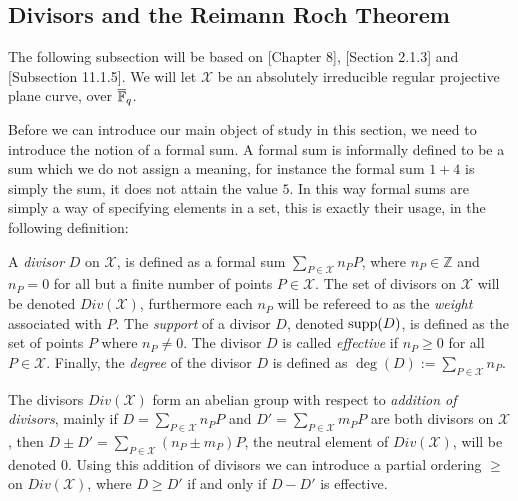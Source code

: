 \subsection{Divisors and the Reimann Roch Theorem}%
\label{subsec:divisors_and_the_reiman_roch_theorem}
The following subsection will be based on \cite{Fulton}[Chapter 8], \cite{alg_geom_codes}[Section 2.1.3] and \cite{CCC_with_CA}[Subsection 11.1.5]. We will let $\mathcal{X}$ be an absolutely irreducible regular projective plane curve, over $\overline{\mathbb{F}}_{q}$.

Before we can introduce our main object of study in this section, we need to introduce the notion of a formal sum. A formal sum is informally defined to be a sum which we do not assign a meaning, for instance the formal sum $1 + 4$ is simply the sum, it does not attain the value $5$. In this way formal sums are simply a way of specifying elements in a set, this is exactly their usage, in the following definition:
\begin{definition}
A \textit{divisor} $D$ on $\mathcal{X}$, is defined as a formal sum $\sum_{P \in \mathcal{X}} n_P P$, where $n_P \in \mathbb{Z}$ and $n_{P} = 0$ for all but a finite number of points $P \in \mathcal{X}$. The set of divisors on $\mathcal{X}$ will be denoted $Div(\mathcal{X})$, furthermore each $n_{P}$ will be refereed to as the \textit{weight} associated with $P$. The \textit{support} of a divisor $D$, denoted $\textnormal{supp}(D)$, is defined as the set of points $P$ where $n_P \not= 0$. The divisor $D$ is called \textit{effective} if $n_P \geq 0$ for all $P \in \mathcal{X}$. Finally, the \textit{degree} of the divisor $D$ is defined as $\deg(D) := \sum_{P \in \mathcal{X}} n_{P}$.
\end{definition}
The divisors $Div(\mathcal{X})$ form an abelian group with respect to \textit{addition of divisors}, mainly if $D = \sum_{P \in \mathcal{X}} n_P P$ and $D' = \sum_{P \in \mathcal{X}} m_{P} P$ are both divisors on $\mathcal{X}$, then $D \pm D' = \sum_{P \in \mathcal{X}} (n_P \pm m_{P}) P$, the neutral element of $Div(\mathcal{X})$, will be denoted $0$.
Using this addition of divisors we can introduce a partial ordering $\geq$ on $Div(\mathcal{X})$, where $D \geq D'$ if and only if $D - D'$ is effective.

